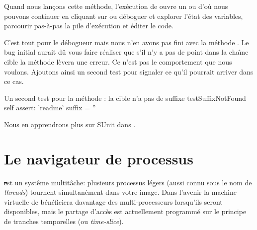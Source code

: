 \documentclass[a4paper,10pt,twoside]{book}
\begin{document}
Quand nous lan\c{c}ons cette m\'ethode, l'ex\'ecution de  ouvre un  ou \emph{} d'o\`u nous pouvons continuer 
en cliquant sur 
ou d\'eboguer et explorer l'\'etat des variables, parcourir pas-\`a-pas la pile d'ex\'ecution et \'editer le code.

C'est tout pour le d\'ebogueur mais nous n'en avons pas fini avec la m\'ethode .
Le bug initial aurait d\^u vous faire r\'ealiser que s'il n'y a pas de point dans la cha\^{\i}ne cible la m\'ethode  l\`evera une erreur.
Ce n'est pas le comportement que nous voulons. Ajoutons ainsi un second test
pour signaler ce qu'il pourrait arriver dans ce cas.  

\begin{method}[testNoSuffix]{Un second test pour la m\'ethode : la cible n'a pas de suffixe}
testSuffixNotFound
	self assert: 'readme' suffix = ''
\end{method}



Nous en apprendrons plus sur SUnit dans .


\section{Le navigateur de processus}

\st est un syst\^eme multit\^ache: plusieurs processus l\'egers (aussi
connu sous le nom de \emph{threads}) tournent simultan\'ement dans
votre image.
Dans l'avenir la machine virtuelle de \pharo b\'en\'eficiera davantage
des multi-processeurs lorsqu'ils seront disponibles, mais le partage
d'acc\`es est actuellement programm\'e sur le principe de
 tranches temporelles (ou \emph{time-slice}).
\end{document}
